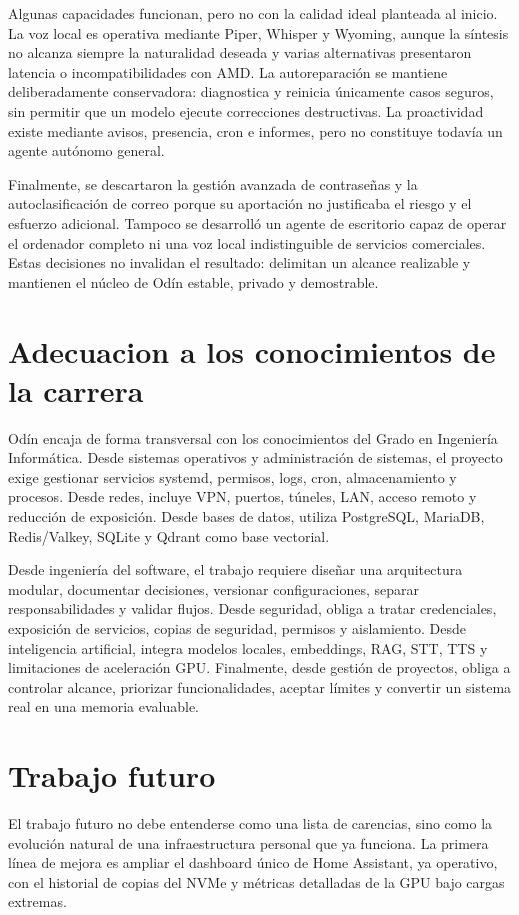Algunas capacidades funcionan, pero no con la calidad ideal planteada al inicio. La voz local es operativa mediante Piper, Whisper y Wyoming, aunque la síntesis no alcanza siempre la naturalidad deseada y varias alternativas presentaron latencia o incompatibilidades con AMD. La autoreparación se mantiene deliberadamente conservadora: diagnostica y reinicia únicamente casos seguros, sin permitir que un modelo ejecute correcciones destructivas. La proactividad existe mediante avisos, presencia, cron e informes, pero no constituye todavía un agente autónomo general.

Finalmente, se descartaron la gestión avanzada de contraseñas y la autoclasificación de correo porque su aportación no justificaba el riesgo y el esfuerzo adicional. Tampoco se desarrolló un agente de escritorio capaz de operar el ordenador completo ni una voz local indistinguible de servicios comerciales. Estas decisiones no invalidan el resultado: delimitan un alcance realizable y mantienen el núcleo de Odín estable, privado y demostrable.

\section{Adecuacion a los conocimientos de la carrera}
Odín encaja de forma transversal con los conocimientos del Grado en Ingeniería Informática. Desde sistemas operativos y administración de sistemas, el proyecto exige gestionar servicios systemd, permisos, logs, cron, almacenamiento y procesos. Desde redes, incluye VPN, puertos, túneles, LAN, acceso remoto y reducción de exposición. Desde bases de datos, utiliza PostgreSQL, MariaDB, Redis/Valkey, SQLite y Qdrant como base vectorial.

Desde ingeniería del software, el trabajo requiere diseñar una arquitectura modular, documentar decisiones, versionar configuraciones, separar responsabilidades y validar flujos. Desde seguridad, obliga a tratar credenciales, exposición de servicios, copias de seguridad, permisos y aislamiento. Desde inteligencia artificial, integra modelos locales, embeddings, RAG, STT, TTS y limitaciones de aceleración GPU. Finalmente, desde gestión de proyectos, obliga a controlar alcance, priorizar funcionalidades, aceptar límites y convertir un sistema real en una memoria evaluable.

\section{Trabajo futuro}
El trabajo futuro no debe entenderse como una lista de carencias, sino como la evolución natural de una infraestructura personal que ya funciona. La primera línea de mejora es ampliar el dashboard único de Home Assistant, ya operativo, con el historial de copias del NVMe y métricas detalladas de la GPU bajo cargas extremas.


